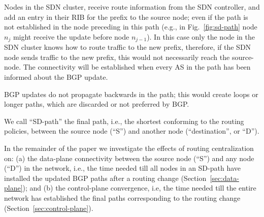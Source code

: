 Nodes in the SDN cluster, receive route information from the SDN controller, and add an entry in their RIB for the prefix to the source node; even if the path is not established in the node preceding in this path (e.g., in Fig.~\ref{fig:sd-path} node $n_{j}$ might receive the update before node $n_{j-1}$). In this case only the node in the SDN cluster knows how to route traffic to the new prefix, therefore, if the SDN node sends traffic to the new prefix, this would not necessarily reach the source-node. The connectivity will be established when every AS in the path has been informed about the BGP update.

BGP updates do not propagate backwards in the path; this would create loops or longer paths, which are discarded or not preferred by BGP.

We call ``SD-path'' the final path, i.e., the shortest conforming to the routing policies, between the source node (``S'') and another node (``destination'', or ``D'').

In the remainder of the paper we investigate the effects of routing centralization on: (a) the data-plane connectivity between the source node (``S'') and any node (``D'') in the network, i.e., the time needed till all nodes in an SD-path have installed the updated BGP paths after a routing change (Section~\ref{sec:data-plane}); and (b) the control-plane convergence, i.e, the time needed till the entire network has established the final paths corresponding to the routing change (Section~\ref{sec:control-plane}).
 

